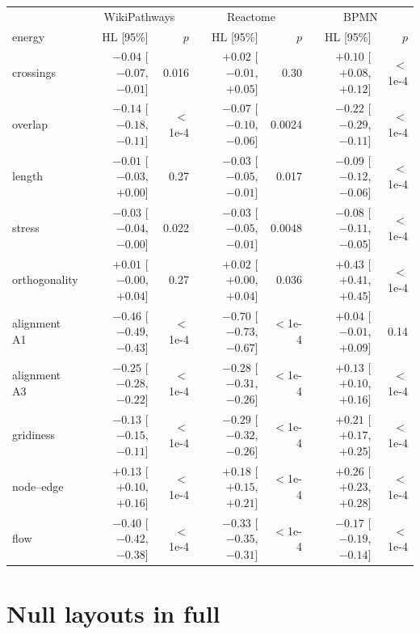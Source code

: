 \documentclass[a4paper,UKenglish]{gd-lipics-v3}
\begin{document}
\begin{center}\scriptsize
\fontsize{6}{7.2}\selectfont\setlength{\tabcolsep}{1.6pt}
\begin{tabular}{lrrrrrr}
\toprule
 & \multicolumn{2}{c}{WikiPathways} & \multicolumn{2}{c}{Reactome} & \multicolumn{2}{c}{BPMN} \\
energy & HL [95\%] &$p$ & HL [95\%] &$p$ & HL [95\%] &$p$ \\
\midrule
crossings & $-0.04$ [$-0.07$,$-0.01$] &0.016 & $+0.02$ [$-0.01$, $+0.05$] &0.30 & $+0.10$ [$+0.08$, $+0.12$] &$<$1e-4 \\
overlap & $-0.14$ [$-0.18$,$-0.11$] &$<$1e-4 & $-0.07$ [$-0.10$,$-0.06$] &0.0024 & $-0.22$ [$-0.29$,$-0.11$] &$<$1e-4 \\
length & $-0.01$ [$-0.03$, $+0.00$] &0.27 & $-0.03$ [$-0.05$,$-0.01$] &0.017 & $-0.09$ [$-0.12$,$-0.06$] &$<$1e-4 \\
stress & $-0.03$ [$-0.04$,$-0.00$] &0.022 & $-0.03$ [$-0.05$,$-0.01$] &0.0048 & $-0.08$ [$-0.11$,$-0.05$] &$<$1e-4 \\
orthogonality & $+0.01$ [$-0.00$, $+0.04$] &0.27 & $+0.02$ [$+0.00$, $+0.04$] &0.036 & $+0.43$ [$+0.41$, $+0.45$] &$<$1e-4 \\
alignment A1 & $-0.46$ [$-0.49$,$-0.43$] &$<$1e-4 & $-0.70$ [$-0.73$,$-0.67$] &$<$1e-4 & $+0.04$ [$-0.01$, $+0.09$] &0.14 \\
alignment A3 & $-0.25$ [$-0.28$,$-0.22$] &$<$1e-4 & $-0.28$ [$-0.31$,$-0.26$] &$<$1e-4 & $+0.13$ [$+0.10$, $+0.16$] &$<$1e-4 \\
gridiness & $-0.13$ [$-0.15$,$-0.11$] &$<$1e-4 & $-0.29$ [$-0.32$,$-0.26$] &$<$1e-4 & $+0.21$ [$+0.17$, $+0.25$] &$<$1e-4 \\
node--edge & $+0.13$ [$+0.10$, $+0.16$] &$<$1e-4 & $+0.18$ [$+0.15$, $+0.21$] &$<$1e-4 & $+0.26$ [$+0.23$, $+0.28$] &$<$1e-4 \\
flow & $-0.40$ [$-0.42$,$-0.38$] &$<$1e-4 & $-0.33$ [$-0.35$,$-0.31$] &$<$1e-4 & $-0.17$ [$-0.19$,$-0.14$] &$<$1e-4 \\
\bottomrule
\end{tabular}
\end{center}

\section{Null layouts in full}\label{app:nulls}
\end{document}
